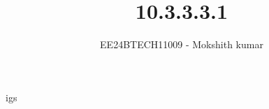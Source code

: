 \documentclass[journal]{IEEEtran}
\begin{document}

\vspace{3cm}igs



\title{10.3.3.3.1}
\author{EE24BTECH11009 - Mokshith kumar}
{\let\newpage\relax\maketitle}

\renewcommand{\thefigure}{\theenumi}
\renewcommand{\thetable}{\theenumi}
\setlength{\intextsep}{10pt} %


\renewcommand{\thetable}{\theenumi}
\end{document}
